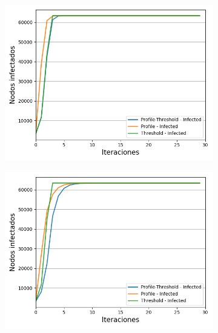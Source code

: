 \documentclass{article}
\begin{document}
\begin{figure}[!tbp]
	\begin{subfigure}[b]{0.5\textwidth}
		\includegraphics[width=\textwidth, height=\textwidth]{../Images/Fig 1 a).png}
		\caption{}
		\label{fig:f1}
	\end{subfigure}
	\hfill
	\begin{subfigure}[b]{0.5\textwidth}
		\includegraphics[width=\textwidth, height=\textwidth]{../Images/Fig 1 b).png}

\end{subfigure}
\end{figure}
\end{document}
